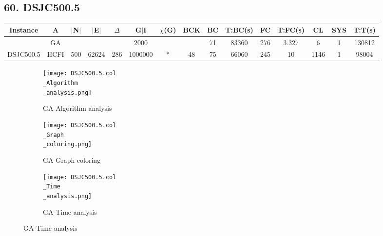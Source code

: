 \documentclass[10pt]{article}
\begin{document}
\subsection*{\hspace{0,9073976cm} 60. DSJC500.5}
\begin{table}[H]
\centering
\begin{tabular}{|c|c|c|c|c|c|c|c|c|c|c|c|c|c|c|}
\hline
Instance& A &$|$N$|$ & $|$E$|$ & $\Delta$ & G$|$I & $\chi$(G) &BCK&BC & T:BC(s) & FC & T:FC(s) & CL & SYS & T:T(s) \\ \hline \hline
	&GA&       &                   &                     &   2000      &     \cellcolor{yellow} & {\cellcolor{yellow}}& {{\cellcolor{green}71}}
& 83360  &276        & 3.327                  &6                    &1         &130812        \\ \cline{2-2} \cline{6-6} \cline{9-15}
 \multirow{-2}{*}{DSJC500.5} &HCFI   &\multirow{-2}{*}{500}   &\multirow{-2}{*}{62624}     &\multirow{-2}{*}{286}     &1000000     &\multirow{-2}{*}{\cellcolor{yellow}*}      & \multirow{-2}{*}{\cellcolor{yellow}48}    &{\cellcolor{green}75}     &66060         &245    &10         &1146    &1     &98004        \\ \hline 
\end{tabular}
\end{table}
\graphicspath{{./Core1/Solutions/GA/DSJC500.5.col}}
\begin{figure}[H]
\begin{subfigure}{.33\textwidth}
  \centering
  \texttt{[image: DSJC500.5.col\\\_Algorithm\\\_analysis.png]}
  \caption{GA-Algorithm analysis}
   \label{fig:subfig1}
\end{subfigure}%
\begin{subfigure}{.33\textwidth}
  \centering
  \texttt{[image: DSJC500.5.col\\\_Graph\\\_coloring.png]}
  \caption{GA-Graph coloring}
  \label{fig:subfig2}
\end{subfigure}
\begin{subfigure}{.33\textwidth}
  \centering
  \texttt{[image: DSJC500.5.col\\\_Time\\\_analysis.png]}
  \caption{GA-Time analysis}
  \end{subfigure}
\end{figure}
\end{document}
